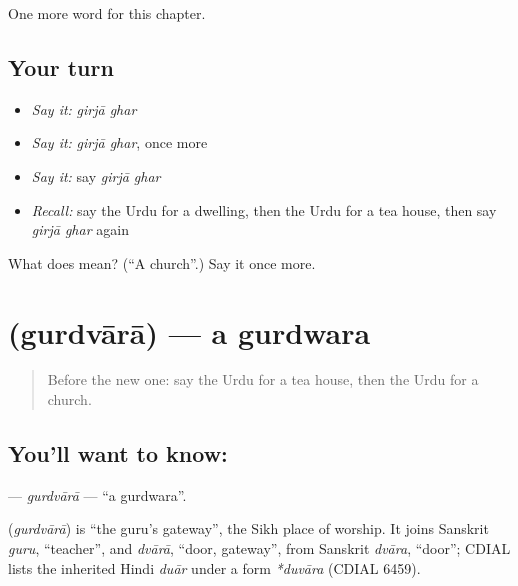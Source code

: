 \begin{grammarlens}[title={What you've built}]
One more word for this chapter.
\end{grammarlens}

\subsection*{Your turn}
\begin{itemize}
\raggedright
  \item \emph{Say it:} \emph{girjā ghar}
  \item \emph{Say it:} \emph{girjā ghar}, once more
  \item \emph{Say it:} say \emph{girjā ghar}
  \item \emph{Recall:} say the Urdu for a dwelling, then the Urdu for a tea house, then say \emph{girjā ghar} again
\end{itemize}

\begin{tcolorbox}[breakable,colback=teal!4,colframe=teal!35!black,title={Before you move on}]
What does   mean? (\textquotedblleft{}A church\textquotedblright{}.) Say it once more.
\end{tcolorbox}
\section[\texorpdfstring{\ur{گوردوارہ} (gurdvārā)}{گوردوارہ (gurdvārā)}]{ (gurdvārā) — a gurdwara}

\label{lesson:UR-C191-gurdvara}



\begin{quote}
Before the new one: say the Urdu for a tea house, then the Urdu for a church.
\end{quote}

\subsection*{You'll want to know: }
\textbf{} — \emph{gurdvārā} — \textquotedblleft{}a gurdwara\textquotedblright{}.

\begin{cousinweb}
\textbf{} (\emph{gurdvārā}) is \textquotedblleft{}the guru's gateway\textquotedblright{}, the Sikh place of worship. It joins Sanskrit \emph{guru}, \textquotedblleft{}teacher\textquotedblright{}, and \emph{dvārā}, \textquotedblleft{}door, gateway\textquotedblright{}, from Sanskrit \emph{dvāra}, \textquotedblleft{}door\textquotedblright{}; CDIAL lists the inherited Hindi \emph{duār} under a form \emph{*duvāra} (CDIAL 6459).
\end{cousinweb}

